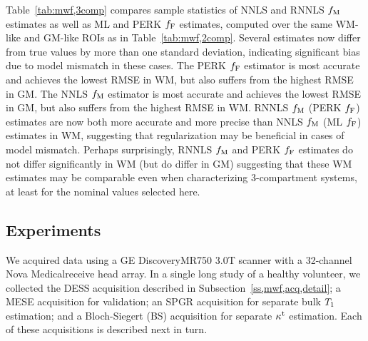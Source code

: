 Table~\ref{tab:mwf,3comp} compares sample statistics
of NNLS and RNNLS $f_\mathrm{M}$ estimates
as well as ML and PERK $f_{\mathrm{F}}$ estimates,
computed over the same WM-like and GM-like ROIs
as in Table~\ref{tab:mwf,2comp}.
Several estimates now differ from true values
by more than one standard deviation,
indicating significant bias due to model mismatch
in these cases.
The PERK $f_{\mathrm{F}}$ estimator is most accurate 
and achieves the lowest RMSE in WM,
but also suffers from the highest RMSE in GM.
The NNLS $f_\mathrm{M}$ estimator is most accurate
and achieves the lowest RMSE in GM,
but also suffers from the highest RMSE in WM.
RNNLS $f_\mathrm{M}$ (PERK $f_{\mathrm{F}}$) estimates are now
both more accurate and more precise
than NNLS $f_\mathrm{M}$ (ML $f_{\mathrm{F}}$) estimates
in WM,
suggesting that regularization may be beneficial
in cases of model mismatch.
Perhaps surprisingly,
RNNLS $f_\mathrm{M}$ and PERK $f_{\mathrm{F}}$ estimates 
do not differ significantly in WM
(but do differ in GM)
suggesting that these WM estimates may be comparable
even when characterizing 3-compartment systems,
at least for the nominal values selected here.

\subsection{\Invivo Experiments}
\label{ss,mwf,exp,invivo}

We acquired \invivo data 
using a GE Discovery\tmark MR750 3.0T scanner
with a 32-channel Nova Medical\regis receive head array.
In a single long study 
of a healthy volunteer,
we collected the DESS acquisition
described in Subsection~\ref{ss,mwf,acq,detail};
a MESE acquisition for validation;
an SPGR acquisition
for separate bulk $T_1$ estimation;
and a Bloch-Siegert (BS) acquisition
for separate $\kappa^{\mathrm{t}}$ estimation.
Each of these acquisitions is described next in turn.

